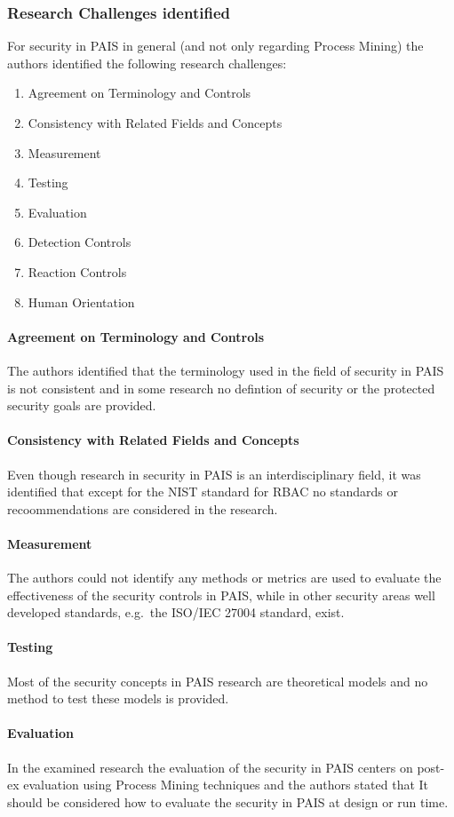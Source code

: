 \documentclass[runningheads]{llncs}
\begin{document}
\subsubsection{Research Challenges identified}\label{Challenges}
For security in PAIS in general (and not only regarding Process Mining) the authors identified the following research challenges:
\begin{enumerate}
    \item Agreement on Terminology and Controls
    \item Consistency with Related Fields and Concepts
    \item Measurement
    \item Testing
    \item Evaluation
    \item Detection Controls
    \item Reaction Controls
    \item Human Orientation
\end{enumerate}
\paragraph{Agreement on Terminology and Controls} The authors identified that the terminology used in the field of security in PAIS is not consistent and in some research no 
defintion of security or the protected security goals are provided.
\paragraph{Consistency with Related Fields and Concepts} Even though research in security in PAIS is an interdisciplinary field, it was identified that except for the NIST standard for
RBAC no standards or recoommendations are considered in the research.
\paragraph{Measurement} The authors could not identify any methods or metrics are used to evaluate the effectiveness of the security controls in PAIS, while in other security areas 
well developed standards, e.g.\ the ISO/IEC 27004 standard, exist.
\paragraph{Testing} Most of the security concepts in PAIS research are theoretical models and no method to test these models is provided.
\paragraph{Evaluation} In the examined research the evaluation of the security in PAIS centers on post-ex evaluation using Process Mining techniques and the authors stated that It
should be considered how to evaluate the security in PAIS at design or run time.
\end{document}
